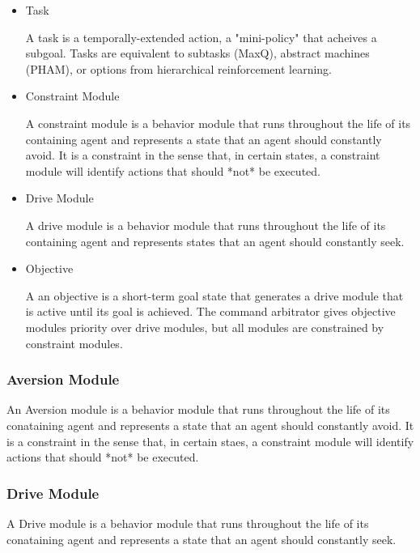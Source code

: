 \begin{itemize}

\item Task

  A task is a temporally-extended action, a "mini-policy" that acheives a
  subgoal.  Tasks are equivalent to subtasks (MaxQ), abstract machines
  (PHAM), or options from hierarchical reinforcement learning.

\item Constraint Module

  A constraint module is a behavior module that runs throughout the
  life of its containing agent and represents a state that an agent
  should constantly avoid.  It is a constraint in the sense that, in
  certain states, a constraint module will identify actions that should
  *not* be executed.

\item Drive Module

  A drive module is a behavior module that runs throughout the
  life of its containing agent and represents states that an agent
  should constantly seek.

\item Objective

  A an objective is a short-term goal state that generates a drive
  module that is active until its goal is achieved.  The command
  arbitrator gives objective modules priority over drive modules, but
  all modules are constrained by constraint modules.

\end{itemize}

\subsubsection{Aversion Module}

An Aversion module is a behavior module that runs throughout the life
of its conataining agent and represents a state that an agent should
constantly avoid.  It is a constraint in the sense that, in certain
staes, a constraint module will identify actions that should *not* be
executed.


\subsubsection{Drive Module}

A Drive module is a behavior module that runs throughout the life of
its conataining agent and represents a state that an agent should
constantly seek.

